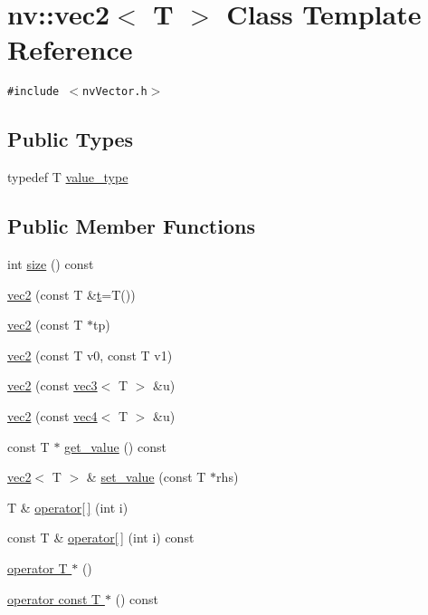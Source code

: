 \hypertarget{classnv_1_1vec2}{
\section{nv::vec2$<$ T $>$ Class Template Reference}
\label{classnv_1_1vec2}
}
{\tt \#include $<$nvVector.h$>$}

\subsection*{Public Types}
\begin{CompactItemize}
\item 
typedef T \hyperlink{classnv_1_1vec2_3d3474ed0b0c4f8cbe07a262ced84b63}{value\_\-type}
\end{CompactItemize}
\subsection*{Public Member Functions}
\begin{CompactItemize}
\item 
int \hyperlink{classnv_1_1vec2_1e82316a32ec1d6c2931dbe913f8b7df}{size} () const 
\item 
\hyperlink{classnv_1_1vec2_a7fc58dbc70f7868151241a774e9a373}{vec2} (const T \&\hyperlink{classnv_1_1vec2_6e3af4948e5eb30ffb805b88dd73cc91}{t}=T())
\item 
\hyperlink{classnv_1_1vec2_c7e7e13b6cd5d421b26d6bec20102a7a}{vec2} (const T $\ast$tp)
\item 
\hyperlink{classnv_1_1vec2_a78e02de943252a1404231965f4c40c0}{vec2} (const T v0, const T v1)
\item 
\hyperlink{classnv_1_1vec2_3c6b381a695bb5a78c1994ced890125b}{vec2} (const \hyperlink{classnv_1_1vec3}{vec3}$<$ T $>$ \&u)
\item 
\hyperlink{classnv_1_1vec2_ca83899c4d744af570583db60cc71ecc}{vec2} (const \hyperlink{classnv_1_1vec4}{vec4}$<$ T $>$ \&u)
\item 
const T $\ast$ \hyperlink{classnv_1_1vec2_2addaebdbc4f636a77fcd481796ba6d0}{get\_\-value} () const 
\item 
\hyperlink{classnv_1_1vec2}{vec2}$<$ T $>$ \& \hyperlink{classnv_1_1vec2_f344f6a9264866e16bf4b069883e89f9}{set\_\-value} (const T $\ast$rhs)
\item 
T \& \hyperlink{classnv_1_1vec2_c2e9b4d7fa0fcd118ff28a17bebf60aa}{operator\mbox{[}$\,$\mbox{]}} (int i)
\item 
const T \& \hyperlink{classnv_1_1vec2_acea4ef0d81af3e56aec4878ab7a2c54}{operator\mbox{[}$\,$\mbox{]}} (int i) const 
\item 
\hyperlink{classnv_1_1vec2_e3d01a8be7d8b3e254e8796a552227f5}{operator T $\ast$} ()
\item 
\hyperlink{classnv_1_1vec2_20cc5f5e2fa68f38fd373e2cd1798be4}{operator const T $\ast$} () const 
\end{CompactItemize}
